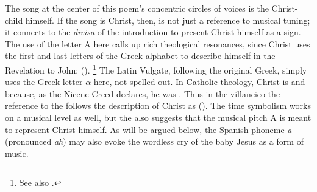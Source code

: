 The song at the center of this poem's concentric circles of voices is the
Christ-child himself.
If the song is Christ, then,  is not
just a reference to musical tuning; it connects to the \emph{divisa} of the
introduction to present Christ himself as a sign.
The use of the letter A here calls up rich theological resonances, since Christ
uses the first and last letters of the Greek alphabet to describe himself in the
Revelation to John:  ().%
    \footnote{See also .}
The Latin Vulgate, following the original Greek, simply uses the Greek letter
$\alpha$ here, not spelled out.
In Catholic theology, Christ is  and 
because, as the Nicene Creed declares, he was .%
    \Autocite
    [42: .]
    {Catholic:Catechismus1614}
Thus in the villancico the reference to the  follows the
description of Christ as 
().
The time symbolism works on a musical level as well, but the 
also suggests that the musical pitch A is meant to represent Christ himself.
As will be argued below, the Spanish phoneme \emph{a} (pronounced \emph{ah}) may
also evoke the wordless cry of the baby Jesus as a form of music.

